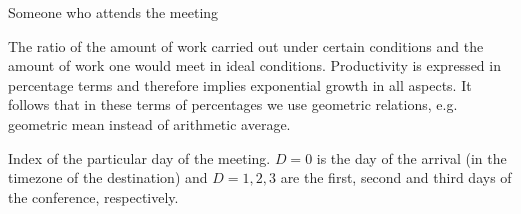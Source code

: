  Someone who attends the meeting

 The ratio of the amount of work carried out under certain conditions and the amount of work one would meet in ideal conditions. Productivity is expressed in percentage terms and therefore implies exponential growth in all aspects. It follows that in these terms of percentages we use geometric relations, e.g. geometric mean instead of arithmetic average.

 Index of the particular day of the meeting. $D = 0$ is the day of the arrival (in the timezone of the destination) and $D = 1, 2, 3$ are the first, second and third days of the conference, respectively.
